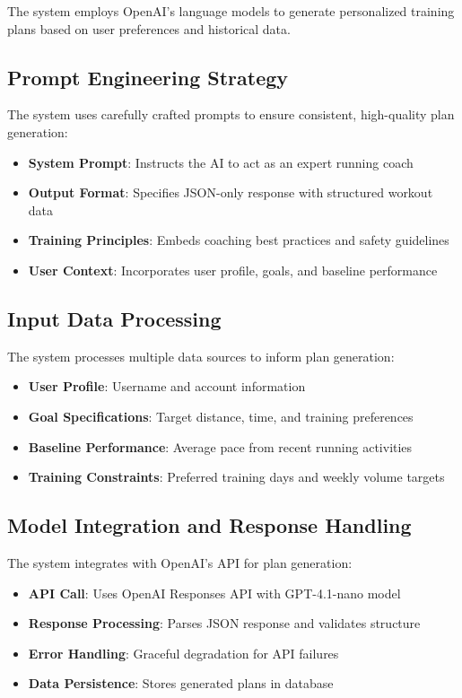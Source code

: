 The system employs OpenAI's language models to generate personalized training plans based on user preferences and historical data.

\subsection{Prompt Engineering Strategy}

The system uses carefully crafted prompts to ensure consistent, high-quality plan generation:

\begin{itemize}
    \item \textbf{System Prompt}: Instructs the AI to act as an expert running coach
    \item \textbf{Output Format}: Specifies JSON-only response with structured workout data
    \item \textbf{Training Principles}: Embeds coaching best practices and safety guidelines
    \item \textbf{User Context}: Incorporates user profile, goals, and baseline performance
\end{itemize}

\subsection{Input Data Processing}

The system processes multiple data sources to inform plan generation:

\begin{itemize}
    \item \textbf{User Profile}: Username and account information
    \item \textbf{Goal Specifications}: Target distance, time, and training preferences
    \item \textbf{Baseline Performance}: Average pace from recent running activities
    \item \textbf{Training Constraints}: Preferred training days and weekly volume targets
\end{itemize}

\subsection{Model Integration and Response Handling}

The system integrates with OpenAI's API for plan generation:

\begin{itemize}
    \item \textbf{API Call}: Uses OpenAI Responses API with GPT-4.1-nano model
    \item \textbf{Response Processing}: Parses JSON response and validates structure
    \item \textbf{Error Handling}: Graceful degradation for API failures
    \item \textbf{Data Persistence}: Stores generated plans in database
\end{itemize}

